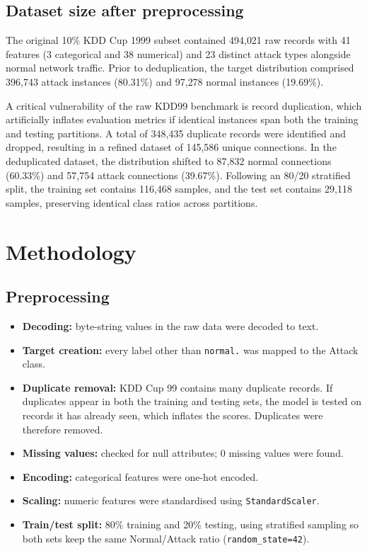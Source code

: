 \documentclass[12pt,a4paper]{article}
\begin{document}
\subsection{Dataset size after preprocessing}
The original 10\% KDD Cup 1999 subset contained 494{,}021 raw records with 41 features (3 categorical and 38 numerical) and 23 distinct attack types alongside normal network traffic. Prior to deduplication, the target distribution comprised 396{,}743 attack instances (80.31\%) and 97{,}278 normal instances (19.69\%).

A critical vulnerability of the raw KDD99 benchmark is record duplication, which artificially inflates evaluation metrics if identical instances span both the training and testing partitions. A total of 348{,}435 duplicate records were identified and dropped, resulting in a refined dataset of 145{,}586 unique connections. In the deduplicated dataset, the distribution shifted to 87{,}832 normal connections (60.33\%) and 57{,}754 attack connections (39.67\%). Following an 80/20 stratified split, the training set contains 116{,}468 samples, and the test set contains 29{,}118 samples, preserving identical class ratios across partitions.

\section{Methodology}

\subsection{Preprocessing}
\begin{itemize}
  \item \textbf{Decoding:} byte-string values in the raw data were decoded to text.
  \item \textbf{Target creation:} every label other than \texttt{normal.} was mapped to the Attack class.
  \item \textbf{Duplicate removal:} KDD Cup 99 contains many duplicate records.
        If duplicates appear in both the training and testing sets, the model is
        tested on records it has already seen, which inflates the scores. Duplicates were therefore removed.
  \item \textbf{Missing values:} checked for null attributes; 0 missing values were found.
  \item \textbf{Encoding:} categorical features were one-hot encoded.
  \item \textbf{Scaling:} numeric features were standardised using \texttt{StandardScaler}.
  \item \textbf{Train/test split:} 80\% training and 20\% testing, using stratified
        sampling so both sets keep the same Normal/Attack ratio
        (\texttt{random\_state=42}).
\end{itemize}
\end{document}
